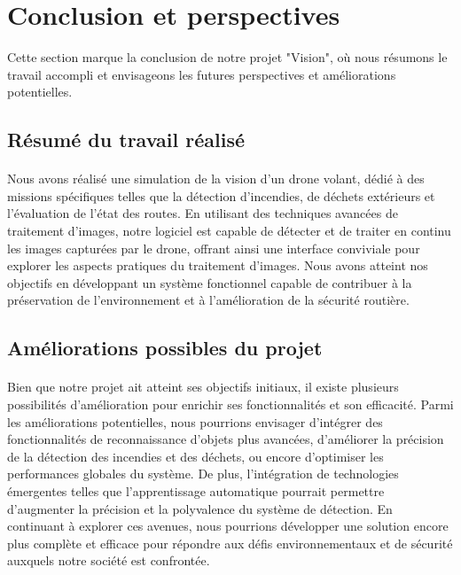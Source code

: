\newpage
\section{Conclusion et perspectives}
\label{sec:conclusion}

\noindent Cette section marque la conclusion de notre projet "Vision", où nous résumons le travail accompli et envisageons les futures perspectives et améliorations potentielles.

\subsection{Résumé du travail réalisé}
\paragraph{}
Nous avons réalisé une simulation de la vision d'un drone volant, dédié à des missions spécifiques telles que la détection d'incendies, de déchets extérieurs et l'évaluation de l'état des routes. En utilisant des techniques avancées de traitement d'images, notre logiciel est capable de détecter et de traiter en continu les images capturées par le drone, offrant ainsi une interface conviviale pour explorer les aspects pratiques du traitement d'images. Nous avons atteint nos objectifs en développant un système fonctionnel capable de contribuer à la préservation de l'environnement et à l'amélioration de la sécurité routière.
\subsection{Améliorations possibles du projet}
\paragraph{}
Bien que notre projet ait atteint ses objectifs initiaux, il existe plusieurs possibilités d'amélioration pour enrichir ses fonctionnalités et son efficacité. Parmi les améliorations potentielles, nous pourrions envisager d'intégrer des fonctionnalités de reconnaissance d'objets plus avancées, d'améliorer la précision de la détection des incendies et des déchets, ou encore d'optimiser les performances globales du système. De plus, l'intégration de technologies émergentes telles que l'apprentissage automatique pourrait permettre d'augmenter la précision et la polyvalence du système de détection. En continuant à explorer ces avenues, nous pourrions développer une solution encore plus complète et efficace pour répondre aux défis environnementaux et de sécurité auxquels notre société est confrontée.
